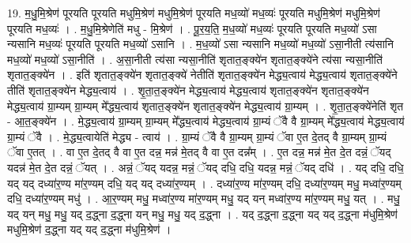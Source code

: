 \documentclass[17pt]{extarticle}
\begin{document}
19. म॒धु॒मि॒श्रेण॑ पूरयति पूरयति मधुमि॒श्रेण॑ मधुमि॒श्रेण॑ पूरयति मध॒व्यो॑ मध॒व्यः॑ पूरयति मधुमि॒श्रेण॑ मधुमि॒श्रेण॑ पूरयति मध॒व्यः॑ । . म॒धु॒मि॒श्रेणेति॑ मधु - मि॒श्रेण॑ । . पू॒र॒य॒ति॒ म॒ध॒व्यो॑ मध॒व्यः॑ पूरयति पूरयति मध॒व्यो॑ ऽसा न्यसानि मध॒व्यः॑ पूरयति पूरयति मध॒व्यो॑ ऽसानि । . म॒ध॒व्यो॑ ऽसा न्यसानि मध॒व्यो॑ मध॒व्यो॑ ऽसा॒नीती त्य॑सानि मध॒व्यो॑ मध॒व्यो॑ ऽसा॒नीति॑ । . अ॒सा॒नीती त्य॑सा न्यसा॒नीति॑ शृतात॒ङ्क्ये॑न शृतात॒ङ्क्ये॑ने त्य॑सा न्यसा॒नीति॑ शृतात॒ङ्क्ये॑न । . इति॑ शृतात॒ङ्क्ये॑न शृतात॒ङ्क्ये॑ नेतीति॑ शृतात॒ङ्क्ये॑न मेद्ध्य॒त्वाय॑ मेद्ध्य॒त्वाय॑ शृतात॒ङ्क्ये॑ने तीति॑ शृतात॒ङ्क्ये॑न मेद्ध्य॒त्वाय॑ । . शृ॒ता॒त॒ङ्क्ये॑न मेद्ध्य॒त्वाय॑ मेद्ध्य॒त्वाय॑ शृतात॒ङ्क्ये॑न शृतात॒ङ्क्ये॑न मेद्ध्य॒त्वाय॑ ग्रा॒म्यम् ग्रा॒म्यम् मे᳚द्ध्य॒त्वाय॑ शृतात॒ङ्क्ये॑न शृतात॒ङ्क्ये॑न मेद्ध्य॒त्वाय॑ ग्रा॒म्यम् । . शृ॒ता॒त॒ङ्क्ये॑नेति॑ शृत - आ॒त॒ङ्क्ये॑न । . मे॒द्ध्य॒त्वाय॑ ग्रा॒म्यम् ग्रा॒म्यम् मे᳚द्ध्य॒त्वाय॑ मेद्ध्य॒त्वाय॑ ग्रा॒म्यं ॅवै वै ग्रा॒म्यम् मे᳚द्ध्य॒त्वाय॑ मेद्ध्य॒त्वाय॑ ग्रा॒म्यं ॅवै । . मे॒द्ध्य॒त्वायेति॑ मेद्ध्य - त्वाय॑ । . ग्रा॒म्यं ॅवै वै ग्रा॒म्यम् ग्रा॒म्यं ॅवा ए॒त दे॒तद् वै ग्रा॒म्यम् ग्रा॒म्यं ॅवा ए॒तत् । . वा ए॒त दे॒तद् वै वा ए॒त दन्न॒ मन्न॑ मे॒तद् वै वा ए॒त दन्न᳚म् । . ए॒त दन्न॒ मन्न॑ मे॒त दे॒त दन्नं॒ ॅयद् यदन्न॑ मे॒त दे॒त दन्नं॒ ॅयत् । . अन्नं॒ ॅयद् यदन्न॒ मन्नं॒ ॅयद् दधि॒ दधि॒ यदन्न॒ मन्नं॒ ॅयद् दधि॑ । . यद् दधि॒ दधि॒ यद् यद् दध्या॑र॒ण्य मा॑र॒ण्यम् दधि॒ यद् यद् दध्या॑र॒ण्यम् । . दध्या॑र॒ण्य मा॑र॒ण्यम् दधि॒ दध्या॑र॒ण्यम् मधु॒ मध्वा॑र॒ण्यम् दधि॒ दध्या॑र॒ण्यम् मधु॑ । . आ॒र॒ण्यम् मधु॒ मध्वा॑र॒ण्य मा॑र॒ण्यम् मधु॒ यद् यन् मध्वा॑र॒ण्य मा॑र॒ण्यम् मधु॒ यत् । . मधु॒ यद् यन् मधु॒ मधु॒ यद् द॒द्ध्ना द॒द्ध्ना यन् मधु॒ मधु॒ यद् द॒द्ध्ना । . यद् द॒द्ध्ना द॒द्ध्ना यद् यद् द॒द्ध्ना म॑धुमि॒श्रेण॑ मधुमि॒श्रेण॑ द॒द्ध्ना यद् यद् द॒द्ध्ना म॑धुमि॒श्रेण॑ । \newline
\end{document}
